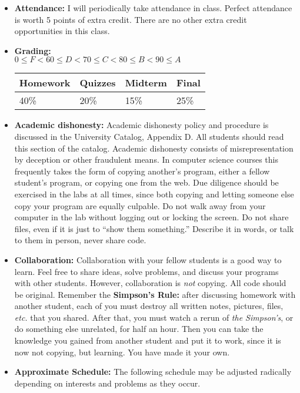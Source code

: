 \documentclass{article}
\begin{document}
\begin{itemize}
\item {\bf Attendance:}  I will periodically take attendance in
  class.  Perfect attendance is worth 5 points of extra credit.  There
  are no other extra credit opportunities in this class.

\item {\bf Grading:} \\
$0\leq F < 60 \leq D < 70 \leq C < 80 \leq B < 90 \leq A$\hfill
\begin{tabular}{|l|l|l|l|}\hline
Homework & Quizzes & Midterm & Final\\\hline
40\% & 20\% & 15\% & 25\%\\\hline
\end{tabular}

\item {\bf Academic dishonesty:} Academic dishonesty policy and
  procedure is discussed in the University Catalog, Appendix D.  All
  students should read this section of the catalog.  Academic
  dishonesty consists of misrepresentation by deception or other
  fraudulent means.  In computer science courses this frequently takes
  the form of copying another's program, either a fellow student's
  program, or copying one from the web.  Due diligence should be
  exercised in the labs at all times, since both copying and letting
  someone else copy your program are equally culpable.  Do not walk
  away from your computer in the lab without logging out or locking
  the screen.  Do not share files, even if it is just to ``show them
  something.''  Describe it in words, or talk to them in person, never
  share code.

\item {\bf Collaboration:} Collaboration with your fellow students is
  a good way to learn.  Feel free to share ideas, solve problems, and
  discuss your programs with other students.  However, collaboration
  is {\em not} copying.  All code should be original.  Remember the
  {\bf Simpson's Rule:} after discussing homework with another
  student, each of you must destroy all written notes, pictures,
  files, {\em etc.} that you shared.  After that, you must watch a
  rerun of {\em the Simpson's}, or do something else unrelated, for
  half an hour.  Then you can take the knowledge you gained from
  another student and put it to work, since it is now not copying, but
  learning.  You have made it your own.

\item
{\bf Approximate Schedule:} The following schedule may be adjusted
radically depending on interests and problems as they occur.


\end{itemize}
\end{document}
